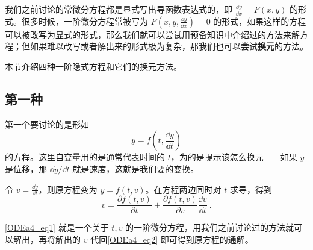 

我们之前讨论的常微分方程都是显式写出导函数表达式的，即 $\frac{\dd y}{\dd x}=F(x, y)$ 的形式。很多时候，一阶微分方程常被写为 $F(x, y, \frac{\dd y}{\dd x})=0$ 的形式，如果这样的方程可以被改写为显式的形式，那么我们就可以尝试用预备知识中介绍过的方法来解方程；但如果难以改写或者解出来的形式极为复杂，那我们也可以尝试\textbf{换元}的方法。

本节介绍四种一阶隐式方程和它们的换元方法。

\subsection{第一种}

第一个要讨论的是形如
\begin{equation}\label{ODEa4_eq2}
y=f(t, \frac{\dd y}{\dd t})
\end{equation}
的方程。这里自变量用的是通常代表时间的 $t$，为的是提示该怎么换元——如果 $y$ 是位移，那 $\dd y/\dd t$ 就是速度，这就是我们要的变换。

令 $v=\frac{\dd y}{\dd t}$，则原方程变为 $y=f(t, v)$。在方程两边同时对 $t$ 求导，得到
\begin{equation}\label{ODEa4_eq1}
v=\frac{\partial f(t, v)}{\partial t}+\frac{\partial f(t, v)}{\partial v}\frac{\dd v}{\dd t}~.
\end{equation}

\autoref{ODEa4_eq1} 就是一个关于 $t, v$ 的一阶微分方程，用我们之前讨论过的方法就可以解出，再将解出的 $v$ 代回\autoref{ODEa4_eq2} 即可得到原方程的通解。

